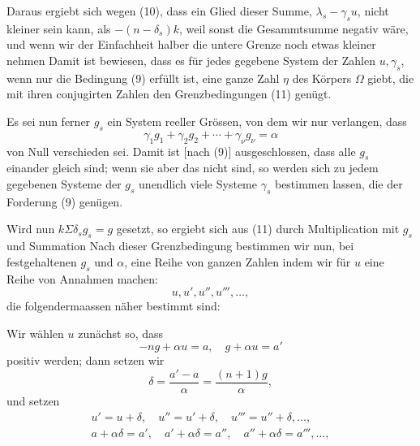 Daraus ergiebt sich wegen (10), dass ein Glied dieser Summe, $\lambda_s - \gamma_s u$, nicht kleiner sein kann, als $-(n - \delta_s) k$, weil sonst die Gesammtsumme negativ w\"are, und wenn wir der Einfachheit halber die untere Grenze noch etwas kleiner nehmen
Damit ist bewiesen, dass es f\"ur jedes gegebene System der Zahlen $u, \gamma_s$, wenn nur die Bedingung (9) erf\"ullt ist, eine ganze Zahl $\eta$ des K\"orpers $\Omega$ giebt, die mit ihren conjugirten Zahlen den Grenzbedingungen (11) gen\"ugt.

Es sei nun ferner $g_s$ ein System reeller Gr\"ossen, von dem wir nur verlangen, dass
\[
\gamma_1 g_1 + \gamma_2 g_2 + \cdots + \gamma_\nu g_\nu = \alpha
\]
von Null verschieden sei. Damit ist [nach (9)] ausgeschlossen, dass alle $g_s$ einander gleich sind; wenn sie aber das nicht sind, so werden sich zu jedem gegebenen Systeme der $g_s$ unendlich viele Systeme $\gamma_s$ bestimmen lassen, die der Forderung (9) gen\"ugen.

Wird nun $k \Sigma \delta_s g_s = g$ gesetzt, so ergiebt sich aus (11) durch Multiplication mit $g_s$ und Summation
Nach dieser Grenzbedingung bestimmen wir nun, bei festgehaltenen $g_s$ und $\alpha$, eine Reihe von ganzen Zahlen
indem wir f\"ur $u$ eine Reihe von Annahmen machen:
\[
u, u', u'', u''', \dots,
\]
die folgendermaassen n\"aher bestimmt sind:

Wir w\"ahlen $u$ zun\"achst so, dass
\[
-n g + \alpha u = a, \quad g + \alpha u = a'
\]
positiv werden; dann setzen wir
\[
\delta = \frac{a' - a}{\alpha} = \frac{(n+1)g}{\alpha},
\]
und setzen
\[
\begin{gathered}
u' = u + \delta, \quad u'' = u' + \delta, \quad u''' = u'' + \delta, \dots,\\
a + \alpha\delta = a', \quad a' + \alpha\delta = a'', \quad a'' + \alpha\delta = a''', \dots,
\end{gathered}
\]
